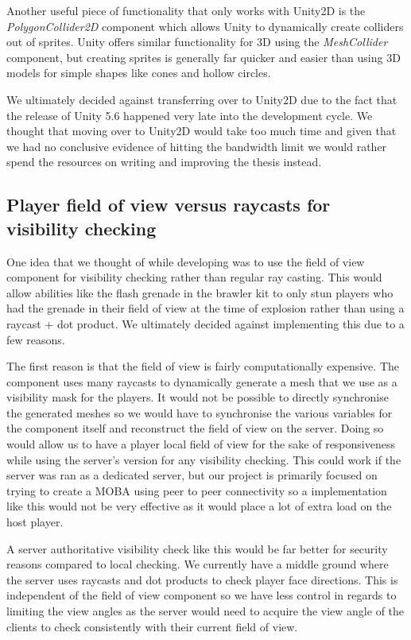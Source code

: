 Another useful piece of functionality that only works with Unity2D is the \emph{PolygonCollider2D} component which allows Unity to dynamically create colliders out of sprites. Unity offers similar functionality for 3D using the \emph{MeshCollider} component, but creating sprites is generally far quicker and easier than using 3D models for simple shapes like cones and hollow circles. 

We ultimately decided against transferring over to Unity2D due to the fact that the release of Unity 5.6 happened very late into the development cycle. We thought that moving over to Unity2D would take too much time and given that we had no conclusive evidence of hitting the bandwidth limit we would rather spend the resources on writing and improving the thesis instead.  

\subsection{Player field of view versus raycasts for visibility checking}
One idea that we thought of while developing was to use the field of view component for visibility checking rather than regular ray casting. This would allow abilities like the flash grenade in the brawler kit to only stun players who had the grenade in their field of view at the time of explosion rather than using a raycast + dot product. We ultimately decided against implementing this due to a few reasons. 

The first reason is that the field of view is fairly computationally expensive. The component uses many raycasts to dynamically generate a mesh that we use as a visibility mask for the players. It would not be possible to directly synchronise the generated meshes so we would have to synchronise the various variables for the component itself and reconstruct the field of view on the server. Doing so would allow us to have a player local field of view for the sake of responsiveness while using the server's version for any visibility checking. This could work if the server was ran as a dedicated server, but our project is primarily focused on trying to create a MOBA using peer to peer connectivity so a implementation like this would not be very effective as it would place a lot of extra load on the host player. 

A server authoritative visibility check like this would be far better for security reasons compared to local checking. We currently have a middle ground where the server uses raycasts and dot products to check player face directions. This is independent of the field of view component so we have less control in regards to limiting the view angles as the server would need to acquire the view angle of the clients to check consistently with their current field of view.

